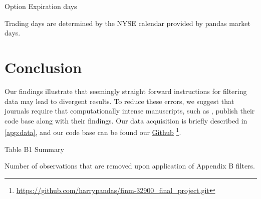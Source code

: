 

\begin{table}[ht]

\centering
{}
\caption{Option Expiration days}



\caption*{Trading days are determined by the NYSE calendar provided by pandas market days. }
\label{table:T2days}
\end{table}






\section{Conclusion} 

Our findings illustrate that seemingly straight forward instructions for filtering data may lead to divergent results. To reduce these errors, we suggest that journals require that computationally intense manuscripts, such as \citet{constantinides2013}, publish their code base along with their findings. Our data acquisition is briefly described in \autoref{app:data}, and our code base can be found our \href{https://github.com/harrypandas/finm-32900_final_project.git}{Github} \footnote{ \url{https://github.com/harrypandas/finm-32900_final_project.git} }.





\newpage

% 

\newpage

\thispagestyle{empty}
\begin{landscape}

\begin{table}

\centering
\caption{Table B1 Summary}
\resizebox{1.4\textwidth}{!}{
\hspace*{-4cm}

}
\caption*{
  Number of observations that are removed upon application of Appendix B filters. 
}
\label{table:tableB1}
\end{table}

\vfill
\raisebox{-3.5cm}{\makebox[\linewidth]{\thepage}}
\end{landscape}
\newpage

